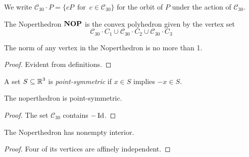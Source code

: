 We write $\mathcal{C}_{30} \cdot P = \{c P \,\text{ for } \, c \in \mathcal{C}_{30}\}$ for the orbit of $P$ under the action of $\mathcal{C}_{30}$.

\begin{definition}
\label{def:noperthedron}
\leanok
The Noperthedron $\operatorname{\mathbf{NOP}}$ is the convex polyhedron given by the vertex set
\[\mathcal{C}_{30} \cdot C_1 \cup \mathcal{C}_{30} \cdot C_2 \cup \mathcal{C}_{30} \cdot C_3\]
\end{definition}

\begin{lemma}
\label{lemma:nopert_verts_norm_le_one}
\leanok
{}
The norm of any vertex in the Noperthedron is no more than 1.
\end{lemma}
\begin{proof}
\leanok
Evident from definitions.
\end{proof}

\begin{definition}
\label{def:pointsymmetric}
\leanok
A set $S \subseteq \operatorname{\mathbb{R}}^3$ is {\em point-symmetric} if $x \in S$ implies $-x \in S$.
\end{definition}

\begin{lemma}
\label{lemma:nopert_point_symmetric}
\leanok
{}
The noperthedron is point-symmetric.
\end{lemma}
\begin{proof}
\leanok
The set $\mathcal{C}_{30}$ contains $-\operatorname{\mathrm{Id}}$.
\end{proof}

\begin{lemma}
\label{lemma:nopert_interior}
\leanok
{}
The Noperthedron has nonempty interior.
\end{lemma}
\begin{proof}
\leanok
Four of its vertices are affinely independent.
\end{proof}
